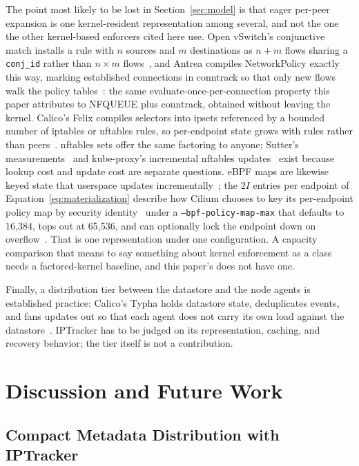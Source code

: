 The point most likely to be lost in Section~\ref{sec:model} is that
eager per-peer expansion is one kernel-resident representation among
several, and not the one the other kernel-based enforcers cited here
use. Open
vSwitch's conjunctive match installs a rule with $n$ sources and $m$
destinations as $n+m$ flows sharing a \texttt{conj\_id} rather than
$n\times m$ flows~\cite{ovsfields}, and Antrea compiles NetworkPolicy
exactly this way, marking established connections in conntrack so that
only new flows walk the policy tables~\cite{antreapipeline}: the same
evaluate-once-per-connection property this paper attributes to NFQUEUE
plus conntrack, obtained without leaving the kernel. Calico's Felix
compiles selectors into ipsets referenced by a bounded number of
iptables or nftables rules, so per-endpoint state grows with rules
rather than peers~\cite{calicoarch}. nftables sets offer the same
factoring to anyone; Sutter's measurements~\cite{sutter2017nftables}
and kube-proxy's incremental nftables updates~\cite{winship2025nftables}
exist because lookup cost and update cost are separate questions. eBPF
maps are likewise keyed state that userspace updates
incrementally~\cite{linuxbpfmaps}; the $2I$ entries per endpoint of
Equation~\ref{eq:materialization} describe how Cilium chooses to key
its per-endpoint policy map by security
identity~\cite{ciliumidentities} under a \texttt{--bpf-policy-map-max}
that defaults to 16,384, tops out at 65,536, and can optionally lock
the endpoint down on overflow~\cite{ciliumagentref}. That is one
representation under one configuration. A capacity comparison that
means to say something about kernel enforcement as a class needs a
factored-kernel baseline, and this paper's does not have one.

Finally, a distribution tier between the datastore and the node agents
is established practice: Calico's Typha holds datastore state,
deduplicates events, and fans updates out so that each agent does not
carry its own load against the datastore~\cite{calicotypha}. IPTracker
has to be judged on its representation, caching, and recovery behavior;
the tier itself is not a contribution.

\section{Discussion and Future Work}
\label{sec:discussion}

\subsection{Compact Metadata Distribution with IPTracker}
\label{sec:iptracker}

